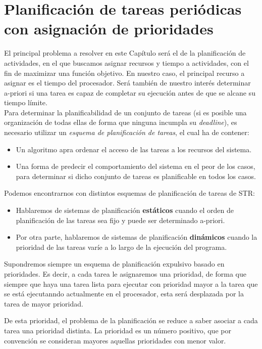 \section{Planificación de tareas periódicas con asignación de prioridades}
El principal problema a resolver en este Capítulo será el de la planificación de actividades, en el que buscamos asignar recursos y tiempo a actividades, con el fin de maximizar una función objetivo. En nuestro caso, el principal recurso a asignar es el tiempo del procesador. Será también de nuestro interés determinar a-priori si una tarea es capaz de completar su ejecución antes de que se alcane su tiempo límite.\\

Para determinar la planificabilidad de un conjunto de tareas (si es posible una organización de todas ellas de forma que ninguna incumpla su \textit{deadline}), es necesario utilizar un \textit{esquema de planificación de tareas}, el cual ha de contener:
\begin{itemize}
    \item Un algoritmo apra ordenar el acceso de las tareas a los recursos del sistema.
    \item Una forma de predecir el comportamiento del sistema en el peor de los casos, para determinar si dicho conjunto de tareas es planificable en todos los casos.
\end{itemize}
Podemos encontrarnos con distintos esquemas de planificación de tareas de STR\@:
\begin{itemize}
    \item Hablaremos de sistemas de planificación \textbf{estáticos} cuando el orden de planificación de las tareas sea fijo y puede ser determinado a-priori.
    \item Por otra parte, hablaremos de sistemas de planificación \textbf{dinámicos} cuando la prioridad de las tareas varíe a lo largo de la ejecución del programa.
\end{itemize}
Supondremos siempre un esquema de planificación expulsivo basado en prioridades. Es decir, a cada tarea le asignaremos una prioridad, de forma que siempre que haya una tarea lista para ejecutar con prioridad mayor a la tarea que se está ejecutanndo actualmente en el procesador, esta será desplazada por la tarea de mayor prioridad.

De esta prioridad, el problema de la planificación se reduce a saber asociar a cada tarea una prioridad distinta. La prioridad es un número positivo, que por convención se consideran mayores aquellas prioridades con menor valor.

